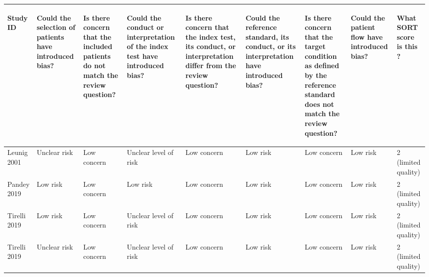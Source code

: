 \begin{table}[ht]
\centering
\begingroup\tiny
\begin{tabular}{lllllllll}
  \hline
\begin{sideways} Study ID \end{sideways} & \begin{sideways} Could the selection of patients have introduced bias? \end{sideways} & \begin{sideways} Is there concern that the included patients do not match the review question? \end{sideways} & \begin{sideways} Could the conduct or interpretation of the index test have introduced bias? \end{sideways} & \begin{sideways} Is there concern that the index test, its conduct, or interpretation differ from the review question? \end{sideways} & \begin{sideways} Could the reference standard, its conduct, or its interpretation have introduced bias? \end{sideways} & \begin{sideways} Is there concern that the target condition as defined by the reference standard does not match the review question? \end{sideways} & \begin{sideways} Could the patient flow have introduced bias? \end{sideways} & \begin{sideways} What SORT score is this ? \end{sideways} \\ 
  \hline
Leunig 2001 & Unclear risk & Low concern & Unclear level of risk & Low concern & Low risk & Low concern & Low risk & 2 (limited quality) \\ 
  Pandey 2019 & Low risk & Low concern & Low risk & Low concern & Low risk & Low concern & Low risk & 2 (limited quality) \\ 
  Tirelli 2019 & Low risk & Low concern & Unclear level of risk & Low concern & Low risk & Low concern & Low risk & 2 (limited quality) \\ 
  Tirelli 2019 & Unclear risk & Low concern & Unclear level of risk & Low concern & Low risk & Low concern & Low risk & 2 (limited quality) \\ 

\end{tabular}
\end{table}

